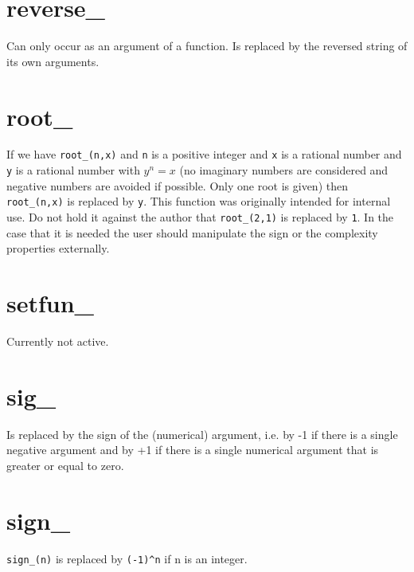 
\section{reverse\_}
\label{funreverse}
\noindent Can only occur as an argument of a function. Is replaced 
by the reversed string of its own arguments.


\section{root\_}
\label{funroot}
\noindent If we have \verb:root_(n,x): and \verb:n: is a positive 
integer and \verb:x: is a rational number and \verb:y: is a rational number 
with $y^n = x$ (no imaginary numbers are considered and negative numbers 
are avoided if possible. Only one root is given) then \verb:root_(n,x): is 
replaced by \verb:y:. This function was originally intended for internal 
use. Do not hold it against the author that \verb:root_(2,1): is replaced 
by \verb:1:. In the case that it is needed the user should manipulate the 
sign or the complexity properties externally.


\section{setfun\_}
\label{funsetfun}
\noindent Currently not active.


\section{sig\_}
\label{funsig}
\noindent Is replaced by the sign of the (numerical) argument, i.e. by -1 
if there is a single negative argument and by +1 if there is a single 
numerical argument that is greater or equal to zero.


\section{sign\_}
\label{funsign}
\noindent \verb:sign_(n): is replaced by \verb:(-1)^n: if n is an 
integer.

